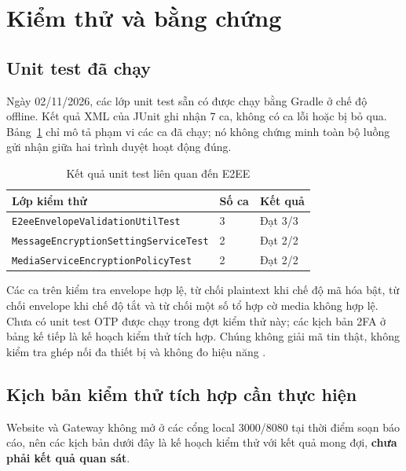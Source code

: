 \section{Kiểm thử và bằng chứng}
\subsection{Unit test đã chạy}
Ngày 02/11/2026, các lớp unit test sẵn có được chạy bằng Gradle ở chế độ offline. Kết quả XML của JUnit ghi nhận 7 ca, không có ca lỗi hoặc bị bỏ qua. Bảng~\ref{tab:unit-test} chỉ mô tả phạm vi các ca đã chạy; nó không chứng minh toàn bộ luồng gửi nhận giữa hai trình duyệt hoạt động đúng.

\begin{table}[htbp]
\centering
\caption{Kết quả unit test liên quan đến E2EE}\label{tab:unit-test}
\begin{tabular}{p{}p{}p{}}
\toprule
Lớp kiểm thử & Số ca & Kết quả \\
\midrule
\texttt{E2eeEnvelopeValidationUtilTest} & 3 & Đạt 3/3 \\
\texttt{MessageEncryptionSettingServiceTest} & 2 & Đạt 2/2 \\
\texttt{MediaServiceEncryptionPolicyTest} & 2 & Đạt 2/2 \\
\bottomrule
\end{tabular}
\end{table}

Các ca trên kiểm tra envelope hợp lệ, từ chối plaintext khi chế độ mã hóa bật, từ chối envelope khi chế độ tắt và từ chối một số tổ hợp cờ media không hợp lệ. Chưa có unit test OTP được chạy trong đợt kiểm thử này; các kịch bản 2FA ở bảng kế tiếp là kế hoạch kiểm thử tích hợp. Chúng không giải mã tin thật, không kiểm tra ghép nối đa thiết bị và không đo hiệu năng \cite{tests}.

\subsection{Kịch bản kiểm thử tích hợp cần thực hiện}
Website và Gateway không mở ở các cổng local 3000/8080 tại thời điểm soạn báo cáo, nên các kịch bản dưới đây là kế hoạch kiểm thử với kết quả mong đợi, \textbf{chưa phải kết quả quan sát}.

